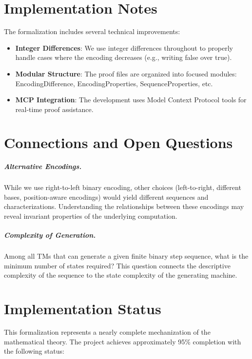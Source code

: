 \chapter{Implementation Notes}

The formalization includes several technical improvements:
\begin{itemize}
\item \textbf{Integer Differences}: We use integer differences throughout to properly handle cases where the encoding decreases (e.g., writing false over true).
\item \textbf{Modular Structure}: The proof files are organized into focused modules: EncodingDifference, EncodingProperties, SequenceProperties, etc.
\item \textbf{MCP Integration}: The development uses Model Context Protocol tools for real-time proof assistance.
\end{itemize}

\chapter{Connections and Open Questions}

\paragraph{Alternative Encodings.} 
While we use right-to-left binary encoding, other choices (left-to-right, different bases, position-aware encodings) would yield different sequences and characterizations. Understanding the relationships between these encodings may reveal invariant properties of the underlying computation.

\paragraph{Complexity of Generation.} 
Among all TMs that can generate a given finite binary step sequence, what is the minimum number of states required? This question connects the descriptive complexity of the sequence to the state complexity of the generating machine.

\chapter{Implementation Status}

This formalization represents a nearly complete mechanization of the mathematical theory. The project achieves approximately 95\% completion with the following status:

